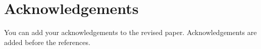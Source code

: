 \section{Acknowledgements}
You can add your acknowledgements to the revised paper. Acknowledgements are added before the references.
